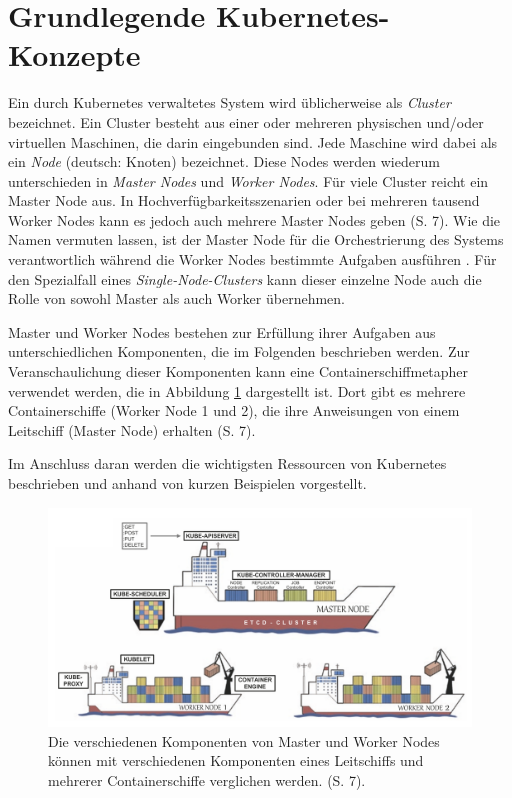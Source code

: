 \documentclass[11pt,a4paper]{article}
\begin{document}
\section{Grundlegende Kubernetes-Konzepte}
\label{sec:Grundlegende_Kubernetes-Konzepte}
Ein durch Kubernetes verwaltetes System wird üblicherweise als \emph{Cluster} bezeichnet.
Ein Cluster besteht aus einer oder mehreren physischen und/oder virtuellen Maschinen, die darin eingebunden sind.
Jede Maschine wird dabei als ein \emph{Node} (deutsch: Knoten) bezeichnet. Diese Nodes werden wiederum unterschieden in
\emph{Master Nodes} und \emph{Worker Nodes}.
Für viele Cluster reicht ein Master Node aus. In Hochverfügbarkeitsszenarien oder bei mehreren
tausend Worker Nodes kann es jedoch auch mehrere Master Nodes geben \cite{Schmeling_Dargatz_2022} (S. 7).
Wie die Namen vermuten lassen, ist der Master Node für die Orchestrierung
des Systems verantwortlich während die Worker Nodes bestimmte Aufgaben ausführen \cite{Bentaleb_Belloum_Sebaa_El-Maouhab_2021}.
Für den Spezialfall eines \emph{Single-Node-Clusters} kann dieser einzelne Node auch die Rolle von sowohl
Master als auch Worker übernehmen.

Master und Worker Nodes bestehen zur Erfüllung ihrer Aufgaben aus unterschiedlichen Komponenten,
die im Folgenden beschrieben werden.
Zur Veranschaulichung dieser Komponenten kann eine Containerschiffmetapher verwendet werden,
die in Abbildung \ref{fig:containerschiff} dargestellt ist. Dort gibt es mehrere Containerschiffe
(Worker Node 1 und 2), die ihre Anweisungen von einem Leitschiff (Master Node) erhalten \cite{Schmeling_Dargatz_2022} (S. 7).

Im Anschluss daran werden die wichtigsten Ressourcen
von Kubernetes beschrieben und anhand von kurzen Beispielen vorgestellt.

\begin{figure}[h]
  \centering
  \includegraphics[width=1\textwidth]{./media/Schmeling_Dargatz_2022 S.7.png}
  \caption{Die verschiedenen Komponenten von Master und Worker Nodes können mit
    verschiedenen Komponenten eines Leitschiffs und mehrerer Containerschiffe verglichen werden. \cite{Schmeling_Dargatz_2022} (S. 7).}
  \label{fig:containerschiff}
\end{figure}
\end{document}
